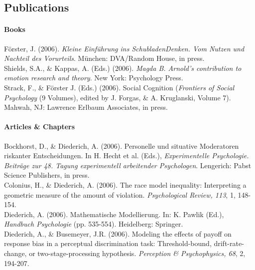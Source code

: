 \newpage

\subsection{Publications}




	\paragraph{Books} \textit{ }
	
\bigskip	

F\"{o}rster, J. (2006). \textit{Kleine Einf\"{u}hrung ins SchubladenDenken. Vom Nutzen und Nachteil des Vorurteils}. M\"{u}nchen: DVA/Random House, in press. \\ 

Shields, S.A., \& Kappas, A. (Eds.) (2006). \textit{Magda B. Arnold's contribution to emotion research and theory}. New York: Psychology Press.\\ 

Strack, F., \& F\"{o}rster J. (Eds.) (2006). Social Cognition (\textit{Frontiers of Social Psychology }(9 Volumes), edited by J. Forgas, \& A. Kruglanski, Volume 7). Mahwah, NJ: Lawrence Erlbaum Associates, in press.\\ 


\paragraph{Articles \& Chapters}\textit{ }

\bigskip

Bockhorst, D., \& Diederich, A. (2006). Personelle und situative Moderatoren riskanter Entscheidungen. In H. Hecht et al. (Eds.), \textit{Experimentelle Psychologie. Beitr\"{a}ge zur 48. Tagung experimentell arbeitender Psychologen}. Lengerich: Pabst Science Publishers, in press.\\ 

Colonius, H., \& Diederich, A. (2006). The race model inequality: Interpreting a geometric measure of the amount of violation. \textit{Psychological Review, 113}, 1, 148-154.\\ 

Diederich, A. (2006). Mathematische Modellierung. In: K. Pawlik (Ed.), \textit{Handbuch Psychologie} (pp. 535-554). Heidelberg: Springer.\\ 

Diederich, A., \& Busemeyer, J.R. (2006). Modeling the effects of payoff on response bias in a perceptual discrimination task: Threshold-bound, drift-rate-change, or two-stage-processing hypothesis. \textit{Perception \& Psychophysics, 68}, 2, 194-207.\\ 

